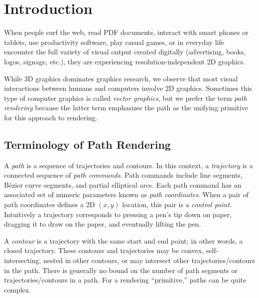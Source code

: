
\section{Introduction}
\label{sec:intro}


\copyrightspace

When people surf the web, read PDF documents, interact with smart
phones or tablets, use productivity software, play casual games, or
in everyday life encounter the full variety of visual output created
digitally (advertising, books, logos, signage, etc.), they are experiencing
resolution-independent 2D graphics.

While 3D graphics dominates graphics research, we observe that most visual
interactions between humans and computers involve 2D graphics.  Sometimes
this type of computer graphics is called {\em vector graphics}, but we
prefer the term {\em path rendering} because the latter term emphasizes
the path as the unifying primitive for this approach to rendering.

\subsection{Terminology of Path Rendering}

A {\em path} is a sequence of trajectories and contours.  In this context,
a {\em trajectory} is a connected sequence of {\em path commands}.
Path commands include line segments, B\'{e}zier curve segments, and
partial elliptical arcs.  Each path command has an associated set of
numeric parameters known as {\em path coordinates}.  When a pair of path
coordinates defines a 2D $(x,y)$ location, this pair is a {\em control
point}.  Intuitively a trajectory corresponds to pressing a pen's tip
down on paper, dragging it to draw on the paper, and eventually lifting
the pen.

A {\em contour} is a trajectory with the same start and end point; in other
words, a closed trajectory.  These contours and trajectories may be
convex, self-intersecting, nested in other contours, or may intersect
other trajectories/contours in the path.  There is generally no bound
on the number of path segments or trajectories/contours in a path.
For a rendering ``primitive,'' paths can be quite complex.

